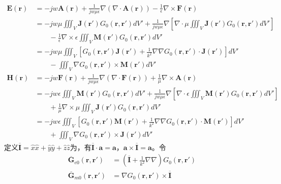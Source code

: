 \documentclass{article}
\numberwithin{equation}{section}
\renewcommand{\vec}[1]{\boldsymbol{#1}}
\begin{document}
\begin{align}
    \label{eq:eq106}
    \mathbf{E}(\vec{r})&=-jw\mathbf{A}(\vec{r})+\frac{1}{jw\mu\epsilon}\nabla(\nabla \cdot \mathbf{A}(\vec{r}))-\frac{1}{\epsilon}\nabla\times\mathbf{F}(\vec{r}) \nonumber \\
                       &=-jw\mu\iiint_V\mathbf{J}(\vec{r}')G_0(\vec{r},\vec{r}')dV'+\frac{1}{jw\mu\epsilon}\nabla\left[\nabla \cdot \mu\iiint_V\mathbf{J}(\vec{r}')G_0(\vec{r},\vec{r}')dV'\right] \nonumber \\
                       &\qquad-\frac{1}{\epsilon}\nabla\times\epsilon\iiint_V\mathbf{M}(\vec{r}')G_0(\vec{r},\vec{r}')dV' \nonumber \\
                       &=-jw\mu\iiint_V\left[G_0(\vec{r},\vec{r}')\mathbf{J}(\vec{r}')+\frac{1}{k^2}\nabla\nabla G_0(\vec{r},\vec{r}') \cdot \mathbf{J}(\vec{r}')\right]dV' \nonumber \\
                       &\qquad-\iiint_V\nabla G_0(\vec{r},\vec{r}')\times \mathbf{M}(\vec{r}')dV' \\
    \label{eq:eq107}
    \mathbf{H}(\vec{r})&=-jw\mathbf{F}(\vec{r})+\frac{1}{jw\mu\epsilon}\nabla(\nabla \cdot \mathbf{F}(\vec{r}))+\frac{1}{\mu}\nabla\times\mathbf{A}(\vec{r}) \nonumber \\
                       &=-jw\epsilon\iiint_V\mathbf{M}(\vec{r}')G_0(\vec{r},\vec{r}')dV'+\frac{1}{jw\mu\epsilon}\nabla\left[\nabla \cdot \epsilon\iiint_V\mathbf{M}(\vec{r}')G_0(\vec{r},\vec{r}')dV'\right] \nonumber \\
                       &\qquad+\frac{1}{\mu}\nabla\times\mu\iiint_V\mathbf{J}(\vec{r}')G_0(\vec{r},\vec{r}')dV' \nonumber \\
                       &=-jw\epsilon\iiint_V\left[G_0(\vec{r},\vec{r}')\mathbf{M}(\vec{r}')+\frac{1}{k^2}\nabla\nabla G_0(\vec{r},\vec{r}') \cdot \mathbf{M}(\vec{r}')\right]dV' \nonumber \\
                       &\qquad+\iiint_V\nabla G_0(\vec{r},\vec{r}')\times \mathbf{J}(\vec{r}')dV'
\end{align}
定义$\overline{\mathbf{I}}=\hat{x}\hat{x}+\hat{y}\hat{y}+\hat{z}\hat{z}$为\textbf{\color{blue}{单位并矢}}，有$\overline{\mathbf{I}}\cdot\vec{a}=\vec{a}$，$\vec{a}\times\overline{\mathbf{I}}=\vec{a}$。令
\begin{align}
    \label{eq:eq108}
    \overline{\mathbf{G}}_{e0}(\vec{r},\vec{r}')&=\left(\overline{\mathbf{I}}+\frac{1}{k^2}\nabla\nabla\right)G_0(\vec{r},\vec{r}') \\
    \label{eq:eq109}
    \overline{\mathbf{G}}_{m0}(\vec{r},\vec{r}')&=\nabla G_0(\vec{r},\vec{r}')\times \overline{\mathbf{I}}
\end{align}
\end{document}

